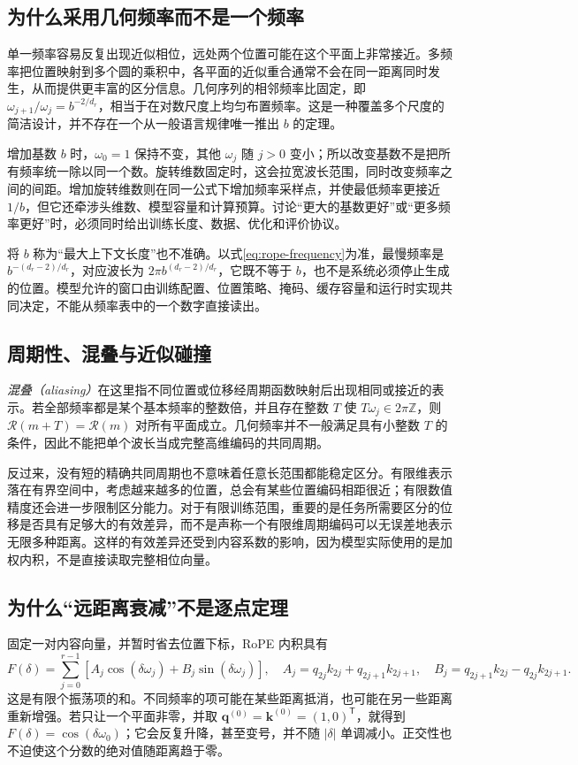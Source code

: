 \documentclass[UTF8,12pt,a4paper,fontset=fandol]{ctexart}
\begin{document}
\subsection{为什么采用几何频率而不是一个频率}
单一频率容易反复出现近似相位，远处两个位置可能在这个平面上非常接近。多频率把位置映射到多个圆的乘积中，各平面的近似重合通常不会在同一距离同时发生，从而提供更丰富的区分信息。几何序列的相邻频率比固定，即 $\omega_{j+1}/\omega_j=b^{-2/d_r}$，相当于在对数尺度上均匀布置频率。这是一种覆盖多个尺度的简洁设计，并不存在一个从一般语言规律唯一推出 $b$ 的定理。

增加基数 $b$ 时，$\omega_0=1$ 保持不变，其他 $\omega_j$ 随 $j>0$ 变小；所以改变基数不是把所有频率统一除以同一个数。旋转维数固定时，这会拉宽波长范围，同时改变频率之间的间距。增加旋转维数则在同一公式下增加频率采样点，并使最低频率更接近 $1/b$，但它还牵涉头维数、模型容量和计算预算。讨论“更大的基数更好”或“更多频率更好”时，必须同时给出训练长度、数据、优化和评价协议。

将 $b$ 称为“最大上下文长度”也不准确。以式\eqref{eq:rope-frequency}为准，最慢频率是 $b^{-(d_r-2)/d_r}$，对应波长为 $2\pi b^{(d_r-2)/d_r}$，它既不等于 $b$，也不是系统必须停止生成的位置。模型允许的窗口由训练配置、位置策略、掩码、缓存容量和运行时实现共同决定，不能从频率表中的一个数字直接读出。

\subsection{周期性、混叠与近似碰撞}
\emph{混叠（aliasing）}在这里指不同位置或位移经周期函数映射后出现相同或接近的表示。若全部频率都是某个基本频率的整数倍，并且存在整数 $T$ 使 $T\omega_j\in2\pi\mathbb Z$，则 $\mathcal R(m+T)=\mathcal R(m)$ 对所有平面成立。几何频率并不一般满足具有小整数 $T$ 的条件，因此不能把单个波长当成完整高维编码的共同周期。

反过来，没有短的精确共同周期也不意味着任意长范围都能稳定区分。有限维表示落在有界空间中，考虑越来越多的位置，总会有某些位置编码相距很近；有限数值精度还会进一步限制区分能力。对于有限训练范围，重要的是任务所需要区分的位移是否具有足够大的有效差异，而不是声称一个有限维周期编码可以无误差地表示无限多种距离。这样的有效差异还受到内容系数的影响，因为模型实际使用的是加权内积，不是直接读取完整相位向量。

\subsection{为什么“远距离衰减”不是逐点定理}
固定一对内容向量，并暂时省去位置下标，RoPE 内积具有
\begin{equation}
F(\delta)=\sum_{j=0}^{r-1}
\left[A_j\cos(\delta\omega_j)+B_j\sin(\delta\omega_j)\right],
\quad
A_j=q_{2j}k_{2j}+q_{2j+1}k_{2j+1},\quad
B_j=q_{2j+1}k_{2j}-q_{2j}k_{2j+1}.
\label{eq:rope-fourier}
\end{equation}
这是有限个振荡项的和。不同频率的项可能在某些距离抵消，也可能在另一些距离重新增强。若只让一个平面非零，并取 $\mathbf q^{(0)}=\mathbf k^{(0)}=(1,0)^{\mathsf T}$，就得到 $F(\delta)=\cos(\delta\omega_0)$；它会反复升降，甚至变号，并不随 $|\delta|$ 单调减小。正交性也不迫使这个分数的绝对值随距离趋于零。
\end{document}
